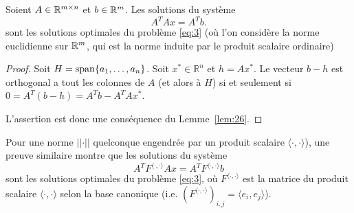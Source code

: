 \begin{theorem}
  \label{thr:6}
  Soient $A \in \mathbb{R}^{m\times n}$ et $b \in \mathbb{R}^m$. Les solutions du système 
  \begin{equation}
    \label{eq:4}    
    A^TAx = A^T b. 
  \end{equation}
  sont les solutions optimales du problème \eqref{eq:3} (où l'on considère la norme euclidienne sur $\mathbb{R}^m$, qui est la norme induite par le produit scalaire ordinaire)
\end{theorem}

\begin{proof}
  Soit $H =  \operatorname{span}\{a_1,\dots,a_n\}$.
  Soit  $x^* ∈ ℝ^n $ et   $h = Ax^*$. Le vecteur $b- h$ est orthogonal a tout les colonnes de $A$
  (et alors à $H$) si et seulement si $0 = A^T (b-h) = A^T b - A^T A x^*$.  

 L'assertion est donc une conséquence du Lemme~\ref{lem:26}. 
\end{proof}

\begin{remark}
Pour une norme $\lvert\lvert \cdot \rvert\rvert$ quelconque engendrée par un produit scalaire $\langle \cdot , \cdot \rangle$), une preuve similaire montre que les solutions du système
  \begin{equation*}  
    A^TF^{\langle \cdot , \cdot \rangle}Ax = A^T F^{\langle \cdot , \cdot \rangle} b
  \end{equation*}
  sont les solutions  optimales du problème \eqref{eq:3}, où $F^{\langle \cdot , \cdot \rangle}$ est la matrice du produit scalaire $\langle \cdot , \cdot \rangle$ selon la base canonique (i.e. $(F^{\langle \cdot , \cdot \rangle})_{i,j} = \langle e_i , e_j \rangle$).
\end{remark}

